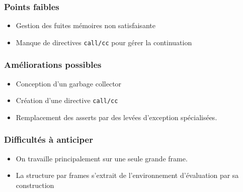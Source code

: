\documentclass[a4paper,11pt]{article}
\begin{document}
\subsubsection*{Points faibles}
\begin{itemize}
\item Gestion des fuites mémoires non satisfaisante
\item Manque de directives \texttt{call/cc} pour gérer la continuation
\end{itemize}

\subsubsection*{Améliorations possibles}
\begin{itemize}
\item Conception d'un garbage collector
\item Création d'une directive \texttt{call/cc}
\item Remplacement des asserts par des levées d'exception spécialisées.
\end{itemize}

\subsubsection*{Difficultés à anticiper}
\begin{itemize}
\item On travaille principalement sur une seule grande frame.
\item La structure par frames s'extrait de l'environnement d'évaluation par sa construction
\end{itemize}
\end{document}

